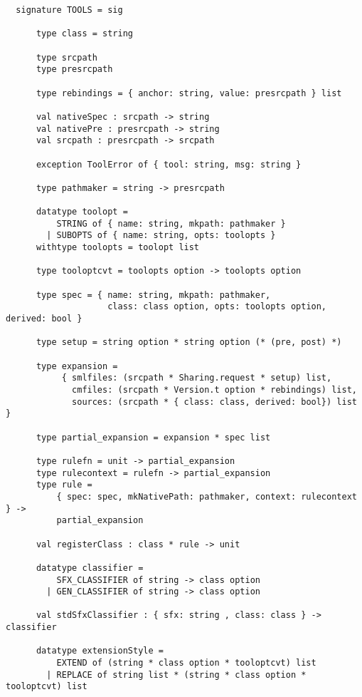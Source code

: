 \begin{small}
\begin{verbatim}
  signature TOOLS = sig
  
      type class = string
  
      type srcpath
      type presrcpath
  
      type rebindings = { anchor: string, value: presrcpath } list
  
      val nativeSpec : srcpath -> string
      val nativePre : presrcpath -> string
      val srcpath : presrcpath -> srcpath
  
      exception ToolError of { tool: string, msg: string }
  
      type pathmaker = string -> presrcpath
  
      datatype toolopt =
          STRING of { name: string, mkpath: pathmaker }
        | SUBOPTS of { name: string, opts: toolopts }
      withtype toolopts = toolopt list
  
      type tooloptcvt = toolopts option -> toolopts option
  
      type spec = { name: string, mkpath: pathmaker,
                    class: class option, opts: toolopts option, derived: bool }
  
      type setup = string option * string option (* (pre, post) *)
  
      type expansion =
           { smlfiles: (srcpath * Sharing.request * setup) list,
             cmfiles: (srcpath * Version.t option * rebindings) list,
             sources: (srcpath * { class: class, derived: bool}) list }
  
      type partial_expansion = expansion * spec list
  
      type rulefn = unit -> partial_expansion
      type rulecontext = rulefn -> partial_expansion
      type rule =
          { spec: spec, mkNativePath: pathmaker, context: rulecontext } ->
          partial_expansion
  
      val registerClass : class * rule -> unit
  
      datatype classifier =
          SFX_CLASSIFIER of string -> class option
        | GEN_CLASSIFIER of string -> class option
  
      val stdSfxClassifier : { sfx: string , class: class } -> classifier
  
      datatype extensionStyle =
          EXTEND of (string * class option * tooloptcvt) list
        | REPLACE of string list * (string * class option * tooloptcvt) list
  

\end{verbatim}
\end{small}
